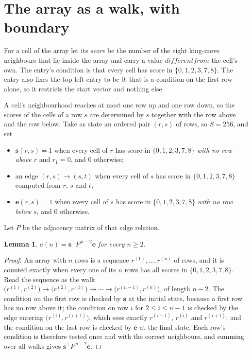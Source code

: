 \documentclass[11pt,a4paper]{article}
\theoremstyle{plain}
\newtheorem{lemma}[theorem]{Lemma}
\theoremstyle{definition}
\begin{document}
\section{The array as a walk, with boundary}

For a cell of the array let its \emph{score} be the number of the eight king-move neighbours that lie inside
the array and carry a value $different from$ the cell's own. The entry's condition is that every cell
has score in $\{0,1,2,3,7,8\}$. The entry also fixes the top-left entry to be $0$; that is a condition on the first row alone, so it restricts the start vector and nothing else.

A cell's neighbourhood reaches at most one row up and one row down, so the scores of the
cells of a row $s$ are determined by $s$ together with the row above and the row below.
Take as state an ordered pair $(r,s)$ of rows, so $S=256$, and set
\begin{itemize}
\item $\mathbf{s}(r,s)=1$ when every cell of $r$ has score in $\{0,1,2,3,7,8\}$ \emph{with no row
above $r$} and $r_1=0$, and $0$ otherwise;
\item an edge $(r,s)\to(s,t)$ when every cell of $s$ has score in $\{0,1,2,3,7,8\}$ computed from
$r$, $s$ and $t$;
\item $\mathbf{e}(r,s)=1$ when every cell of $s$ has score in $\{0,1,2,3,7,8\}$ \emph{with no row
below $s$}, and $0$ otherwise.
\end{itemize}
Let $P$ be the adjacency matrix of that edge relation.

\begin{lemma}\label{lem:walk}
$a(n)=\mathbf{s}^{\!\top}P^{\,n-2}\mathbf{e}$ for every $n\ge2$.
\end{lemma}

\begin{proof}
An array with $n$ rows is a sequence $r^{(1)},\dots,r^{(n)}$ of rows, and it is counted
exactly when every one of its $n$ rows has all scores in $\{0,1,2,3,7,8\}$. Read the sequence as the
walk $\bigl(r^{(1)},r^{(2)}\bigr)\to\bigl(r^{(2)},r^{(3)}\bigr)\to\cdots\to
\bigl(r^{(n-1)},r^{(n)}\bigr)$, of length $n-2$. The condition on the first row is
checked by $\mathbf{s}$ at the initial state, because a first row has no row above it; the
condition on row $i$ for $2\le i\le n-1$ is checked by the edge entering
$\bigl(r^{(i)},r^{(i+1)}\bigr)$, which sees exactly $r^{(i-1)}$, $r^{(i)}$ and
$r^{(i+1)}$; and the condition on the last row is checked by $\mathbf{e}$ at the final
state. Each row's condition is therefore tested once and with the correct neighbours, and
summing over all walks gives $\mathbf{s}^{\!\top}P^{\,n-2}\mathbf{e}$.
\end{proof}
\end{document}
